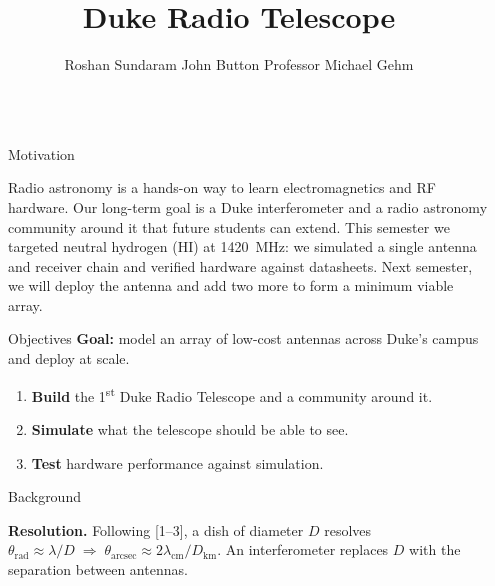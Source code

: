 \documentclass[final]{beamer}
\title{Duke Radio Telescope}
\author{Roshan Sundaram \quad\textperiodcentered\quad John Button \quad\textperiodcentered\quad Professor Michael Gehm}
\institute{Pierre R. Lamond Department of Electrical and Computer Engineering, Duke University}
\newcommand{\refnumperley}{1}\newcommand{\refnummacgregor}{2}
\newcommand{\refnumtms}{3}\newcommand{\refnumnvss}{4}
\newlength{\colwidth}
\newcommand{\outercolumn}{\begin{column}{\posteredge}\end{column}}
\begin{document}
\begin{frame}[t]
  \begin{columns}[t, totalwidth=\paperwidth]

    \outercolumn

    \begin{column}{\colwidth}

      \begin{block}{Motivation}
        
        Radio astronomy is a hands-on way to learn electromagnetics and RF hardware. Our long-term goal is a Duke interferometer and a radio astronomy community around it that future students can extend. This semester we targeted neutral hydrogen (HI) at 1420~MHz: we simulated a single antenna and receiver chain and verified hardware against datasheets. Next semester, we will deploy the antenna and add two more to form a minimum viable array.
      \end{block}

      \begin{block}{Objectives}
        \textbf{Goal:} model an array of low-cost antennas across Duke's campus and deploy at scale.
        \begin{enumerate}\setlength{\itemsep}{0pt}\setlength{\parskip}{0pt}
          \item \textbf{Build} the 1\textsuperscript{st} Duke Radio Telescope and a community around it.
          \item \textbf{Simulate} what the telescope should be able to see.
          \item \textbf{Test} hardware performance against simulation.
        \end{enumerate}
      \end{block}


      \begin{exampleblock}{Background}
        \setlength{\abovedisplayskip}{4pt}\setlength{\belowdisplayskip}{4pt}%
        \noindent\begin{minipage}[c]{0.57\linewidth}
          \textbf{Resolution.} Following {\color{dukeroyal}[\refnumperley--\refnumtms]}, a dish of diameter $D$ resolves
          $\theta_{\text{rad}}\approx\lambda/D \;\Rightarrow\; \theta_{\text{arcsec}}\approx 2\lambda_{\text{cm}}/D_{\text{km}}$.
          An interferometer replaces $D$ with the separation between antennas.


\end{minipage}
\end{exampleblock}
\end{column}
\end{columns}
\end{frame}
\end{document}
